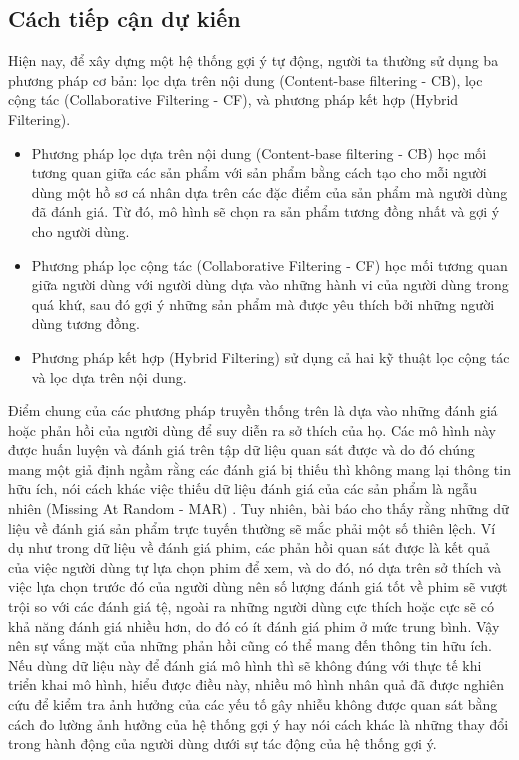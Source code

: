 \documentclass{article}[14pt]
\begin{document}
{    \subsection{Cách tiếp cận dự kiến}
    
    Hiện nay, để xây dựng một hệ thống gợi ý tự động, người ta thường sử dụng ba phương pháp cơ bản: lọc dựa trên nội dung (Content-base filtering - CB), lọc cộng tác (Collaborative Filtering - CF), và phương pháp kết hợp (Hybrid Filtering). 
    \begin{itemize}
        \item Phương pháp lọc dựa trên nội dung (Content-base filtering - CB) học mối tương quan giữa các sản phẩm với sản phẩm bằng cách tạo cho mỗi người dùng một hồ sơ cá nhân dựa trên các đặc điểm của sản phẩm mà người dùng đã đánh giá. Từ đó, mô hình sẽ chọn ra sản phẩm tương đồng nhất và gợi ý cho người dùng.
        \item Phương pháp lọc cộng tác (Collaborative Filtering - CF) học mối tương quan giữa người dùng với người dùng dựa vào những hành vi của người dùng trong quá khứ, sau đó gợi ý những sản phẩm mà được yêu thích bởi những người dùng tương đồng.
        \item Phương pháp kết hợp (Hybrid Filtering) sử dụng cả hai kỹ thuật lọc cộng tác và lọc dựa trên nội dung.
    \end{itemize}
    Điểm chung của các phương pháp truyền thống trên là dựa vào những đánh giá hoặc phản hồi của người dùng để suy diễn ra sở thích của họ. Các mô hình này được huấn luyện và đánh giá trên tập dữ liệu quan sát được và do đó chúng mang một giả định ngầm rằng các đánh giá bị thiếu thì không mang lại thông tin hữu ích, nói cách khác việc thiếu dữ liệu đánh giá của các sản phẩm là ngẫu nhiên (Missing At Random - MAR) \cite{mar}. Tuy nhiên, bài báo \cite{bias} cho thấy rằng những dữ liệu về đánh giá sản phẩm trực tuyến  thường sẽ mắc phải một số thiên lệch. Ví dụ như trong dữ liệu về đánh giá phim, các phản hồi quan sát được là kết quả của việc người dùng tự lựa chọn phim để xem, và do đó, nó dựa trên sở thích và việc lựa chọn trước đó của người dùng nên số lượng đánh giá tốt về phim sẽ vượt trội so với các đánh giá tệ, ngoài ra những người dùng cực thích hoặc cực sẽ có khả năng  đánh giá nhiều hơn, do đó có ít đánh giá phim ở mức trung bình. Vậy nên sự vắng mặt của những phản hồi cũng có thể mang đến thông tin hữu ích. Nếu dùng dữ liệu này để đánh giá mô hình thì sẽ không đúng với thực tế khi triển khai mô hình, hiểu được điều này, nhiều mô hình nhân quả đã được nghiên cứu để kiểm tra ảnh hưởng của các yếu tố gây nhiễu không được quan sát bằng cách đo lường ảnh hưởng của hệ thống gợi ý hay nói cách khác là những thay đổi trong hành động của người dùng dưới sự tác động của hệ thống gợi ý.
    
}
\end{document}
